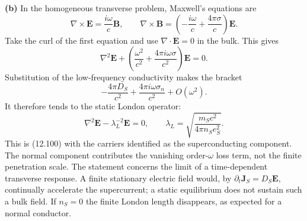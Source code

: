 \medskip\noindent\textbf{(b)} In the homogeneous transverse problem, Maxwell's equations are
\[
\nabla\times\mathbf E=\frac{i\omega}{c}\mathbf B,\qquad
\nabla\times\mathbf B=
 \left(-\frac{i\omega}{c}+\frac{4\pi\sigma}{c}\right)\mathbf E.
\]
Take the curl of the first equation and use $\nabla\cdot\mathbf E=0$
in the bulk.  This gives
\[
\nabla^2\mathbf E+
 \left(\frac{\omega^2}{c^2}+\frac{4\pi i\omega\sigma}{c^2}\right)
 \mathbf E=0.
\]
Substitution of the low-frequency conductivity makes the bracket
\[
-\frac{4\pi D_S}{c^2}
+\frac{4\pi i\omega\sigma_n}{c^2}+O(\omega^2).
\]
It therefore tends to the static London operator:
\[
\boxed{\nabla^2\mathbf E-\lambda_L^{-2}\mathbf E=0,
\qquad
\lambda_L=\sqrt{\frac{m_Sc^2}{4\pi n_Se_S^2}}.}
\]
This is (12.100) with the carriers identified as the superconducting
component.  The normal component contributes the vanishing
order-$\omega$ loss term, not the finite penetration scale.
The statement concerns the limit of a time-dependent transverse
response.  A finite stationary electric field would, by
$\partial_t\mathbf J_S=D_S\mathbf E$, continually accelerate the
supercurrent; a static equilibrium does not sustain such a bulk
field.  If $n_S=0$ the finite London length disappears, as expected
for a normal conductor.

